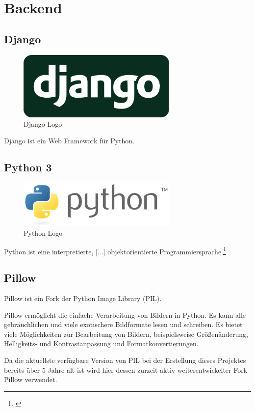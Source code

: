 \section{Backend}
\subsection{Django}
\begin{figure}[h]
  \centering
  \includegraphics[width=0.7\textwidth]{images/django-logo-negative.pdf}
  \caption{Django Logo}
\end{figure}
	Django ist ein Web Framework für Python.
\subsection{Python 3}
\begin{figure}[h]
  \centering
  \includegraphics[width=0.7\textwidth]{images/python-logo.pdf}
  \caption{Python Logo}
\end{figure}
	Python ist eine interpretierte, [...] objektorientierte Programmiersprache.\footnote{\citet{pythonFaq}}
\subsection{Pillow}
	Pillow ist ein Fork der Python Image Library (PIL).

	Pillow ermöglicht die einfache Verarbeitung von Bildern in Python. Es kann alle gebräuchlichen und viele exotischere Bildformate lesen und schreiben. Es bietet viele Möglichkeiten zur Bearbeitung von Bildern, beispielsweise Größenänderung, Helligkeits- und Kontrastanpassung und Formatkonvertierungen.

	Da die aktuellste verfügbare Version von PIL bei der Erstellung dieses Projektes bereits über 5 Jahre alt ist wird hier dessen zurzeit aktiv weiterentwickelter Fork Pillow verwendet.